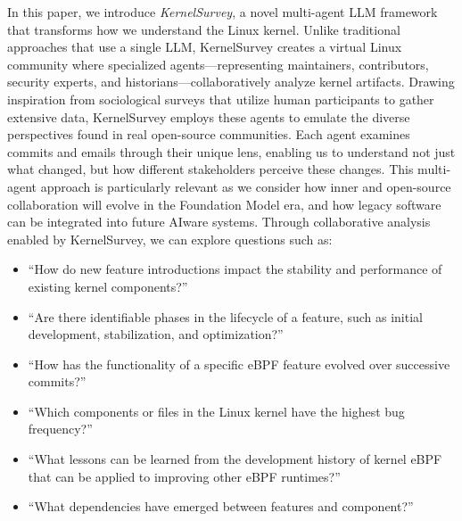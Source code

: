 \documentclass[sigconf,review,anonymous]{acmart}
\begin{document}
In this paper, we introduce \emph{KernelSurvey}, a novel multi-agent LLM framework that transforms how we understand the Linux kernel. Unlike traditional approaches that use a single LLM, KernelSurvey creates a virtual Linux community where specialized agents—representing maintainers, contributors, security experts, and historians—collaboratively analyze kernel artifacts. Drawing inspiration from sociological surveys that utilize human participants to gather extensive data, KernelSurvey employs these agents to emulate the diverse perspectives found in real open-source communities. Each agent examines commits and emails\cite{linux,tan2019communicate,schneider2016differentiating} through their unique lens, enabling us to understand not just what changed, but how different stakeholders perceive these changes. This multi-agent approach is particularly relevant as we consider how inner and open-source collaboration will evolve in the Foundation Model era, and how legacy software can be integrated into future AIware systems. Through collaborative analysis enabled by KernelSurvey, we can explore questions such as:


\begin{itemize}
    \item ``How do new feature introductions impact the stability and performance of existing kernel components?''
    \item ``Are there identifiable phases in the lifecycle of a feature, such as initial development, stabilization, and optimization?''
    \item ``How has the functionality of a specific eBPF feature evolved over successive commits?''
    \item ``Which components or files in the Linux kernel have the highest bug frequency?''
    \item ``What lessons can be learned from the development history of kernel eBPF that can be applied to improving other eBPF runtimes?''
    \item ``What dependencies have emerged between features and component?''
\end{itemize}
\end{document}
